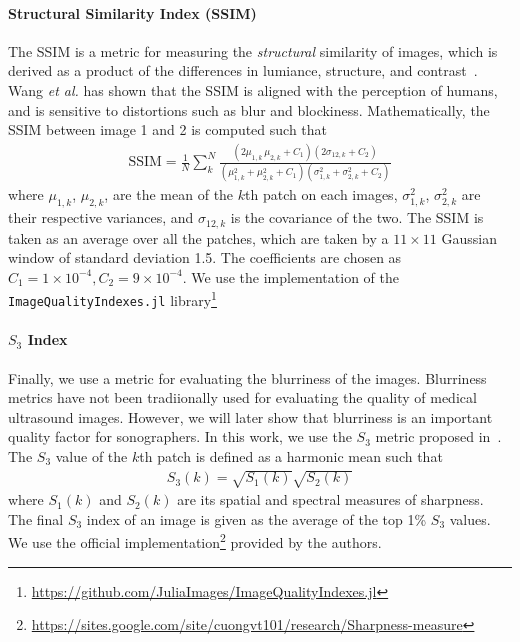 \paragraph{Structural Similarity Index (SSIM)}
The SSIM is a metric for measuring the \textit{structural} similarity of images, which is derived as a product of the differences in lumiance, structure, and contrast~\cite{wang_image_2004a}.
Wang \textit{et al.} has shown that the SSIM is aligned with the perception of humans, and is sensitive to distortions such as blur and blockiness.
Mathematically, the SSIM between image 1 and 2 is computed such that
\begin{align}
  \mathrm{SSIM} = \frac{1}{N} \sum_k^N \frac{
    (2 \mu_{1,k} \, \mu_{2, k} + C_1)(2 \sigma_{12, k} + C_2)
  }{
    (\mu_{1,k}^2 + \mu_{2,k}^2 + C_1) ( \sigma_{1,k}^2 + \sigma_{2,k}^2 + C_2)
  }
\end{align}
where \(\mu_{1,k}\), \(\mu_{2,k}\), are the mean of the \(k\)th patch on each images, \(\sigma_{1,k}^2\), \(\sigma_{2,k}^2\) are their respective variances, and \(\sigma_{12, k}\) is the covariance of the two.
The SSIM is taken as an average over all the patches, which are taken by a \(11 \times 11\) Gaussian window of standard deviation 1.5.
The coefficients are chosen as \(C_1 = 1 \times 10^{-4}, C_2 = 9 \times 10^{-4} \).
We use the implementation of the \texttt{ImageQualityIndexes.jl} library\footnote{\url{https://github.com/JuliaImages/ImageQualityIndexes.jl}}

\paragraph{\(S_3\) Index}
Finally, we use a metric for evaluating the blurriness of the images.
Blurriness metrics have not been tradiionally used for evaluating the quality of medical ultrasound images.
However, we will later show that blurriness is an important quality factor for sonographers.
In this work, we use the \(S_3\) metric proposed in~\cite{vu_bf_2012}.
The \(S_3\) value of the \(k\)th patch is defined as a harmonic mean such that
\begin{align}
  S_3\left(k\right) = \sqrt{S_1\left(k\right)} \sqrt{S_2\left(k\right)}
\end{align}
where \(S_1\left(k\right)\) and \(S_2\left(k\right)\) are its spatial and spectral measures of sharpness.
The final \(S_3\) index of an image is given as the average of the top 1\% \(S_3\) values.
We use the official implementation\footnote{\url{https://sites.google.com/site/cuongvt101/research/Sharpness-measure}} provided by the authors.

